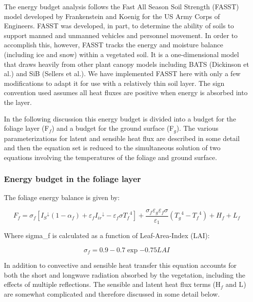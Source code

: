 The energy budget analysis follows the Fast All Season Soil Strength (FASST) model developed by Frankenstein and Koenig for the US Army Corps of Engineers. FASST was developed, in part, to determine the ability of soils to support manned and unmanned vehicles and personnel movement. In order to accomplish this, however, FASST tracks the energy and moisture balance (including ice and snow) within a vegetated soil. It is a one-dimensional model that draws heavily from other plant canopy models including BATS (Dickinson et al.) and SiB (Sellers et al.). We have implemented FASST here with only a few modifications to adapt it for use with a relatively thin soil layer. The sign convention used assumes all heat fluxes are positive when energy is absorbed into the layer.

In the following discussion this energy budget is divided into a budget for the foliage layer (F\(_{f}\)) and a budget for the ground surface (F\(_{g}\)­). The various parameterizations for latent and sensible heat flux are described in some detail and then the equation set is reduced to the simultaneous solution of two equations involving the temperatures of the foliage and ground surface.

\subsubsection{Energy budget in the foliage layer}\label{energy-budget-in-the-foliage-layer}

The foliage energy balance is given by:

\begin{equation}
{F_f} = {\sigma_f}\left[ {{I_S}^ \downarrow (1 - {\alpha_f}) + {\varepsilon_f}{I_{ir}}^ \downarrow  - {\varepsilon_f}\sigma {T_f}^4} \right] + \frac{{{\sigma_f}{\varepsilon_g}{\varepsilon_f}\sigma }}{{{\varepsilon_1}}}\left( {{T_g}^4 - {T_f}^4} \right) + {H_f} + {L_f}
\end{equation}

Where sigma\_f is calculated as a function of Leaf-Area-Index (LAI):

\begin{equation}
\sigma_f = 0.9 - 0.7 \exp{-0.75 LAI }
\end{equation}

In addition to convective and sensible heat transfer this equation accounts for both the short and longwave radiation absorbed by the vegetation, including the effects of multiple reflections. The sensible and latent heat flux terms (H\(_{f}\) and L\(_{­}\)) are somewhat complicated and therefore discussed in some detail below.

